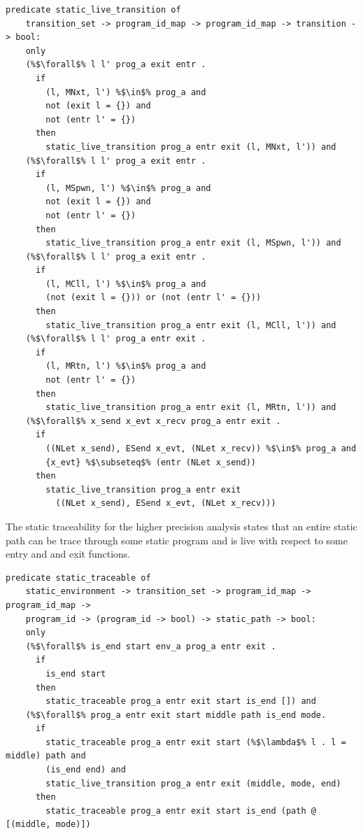 \documentclass{article}
\begin{document}
\begin{lstlisting}[language=logic, escapechar=\%]
  predicate static_live_transition of
    transition_set -> program_id_map -> program_id_map -> transition -> bool:
    only
    (%$\forall$% l l' prog_a exit entr . 
      if
        (l, MNxt, l') %$\in$% prog_a and
        not (exit l = {}) and
        not (entr l' = {})
      then
        static_live_transition prog_a entr exit (l, MNxt, l')) and
    (%$\forall$% l l' prog_a exit entr .
      if
        (l, MSpwn, l') %$\in$% prog_a and 
        not (exit l = {}) and
        not (entr l' = {})
      then
        static_live_transition prog_a entr exit (l, MSpwn, l')) and
    (%$\forall$% l l' prog_a exit entr .
      if
        (l, MCll, l') %$\in$% prog_a and
        (not (exit l = {})) or (not (entr l' = {}))
      then
        static_live_transition prog_a entr exit (l, MCll, l')) and
    (%$\forall$% l l' prog_a entr exit .
      if
        (l, MRtn, l') %$\in$% prog_a and
        not (entr l' = {})
      then
        static_live_transition prog_a entr exit (l, MRtn, l')) and
    (%$\forall$% x_send x_evt x_recv prog_a entr exit .
      if
        ((NLet x_send), ESend x_evt, (NLet x_recv)) %$\in$% prog_a and 
        {x_evt} %$\subseteq$% (entr (NLet x_send))
      then
        static_live_transition prog_a entr exit
          ((NLet x_send), ESend x_evt, (NLet x_recv)))
  \end{lstlisting}

The static traceability for the higher precision analysis states
that an entire static path can be trace through some static program and
is live with respect to some entry and and exit functions.

\begin{lstlisting}[language=logic, escapechar=\%]
  predicate static_traceable of
    static_environment -> transition_set -> program_id_map -> program_id_map ->
    program_id -> (program_id -> bool) -> static_path -> bool:
    only
    (%$\forall$% is_end start env_a prog_a entr exit .
      if
        is_end start
      then
        static_traceable prog_a entr exit start is_end []) and
    (%$\forall$% prog_a entr exit start middle path is_end mode. 
      if
        static_traceable prog_a entr exit start (%$\lambda$% l . l = middle) path and 
        (is_end end) and
        static_live_transition prog_a entr exit (middle, mode, end) 
      then
        static_traceable prog_a entr exit start is_end (path @ [(middle, mode)])
  \end{lstlisting}
\end{document}
